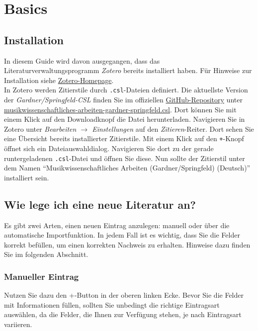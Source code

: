 \section{Basics}\label{guide}
\subsection{Installation}
In diesem Guide wird davon ausgegangen, dass das Literaturverwaltungsprogramm \textit{Zotero} bereits installiert haben. F\"ur Hinweise zur Installation siehe \href{https://www.zotero.org/support/installation}{Zotero-Homepage}.\\
In Zotero werden Zitierstile durch \verb|.csl|-Dateien definiert.
Die aktuellste Version der \textit{Gardner/Springfeld-CSL} finden Sie im offiziellen \href{https://github.com/digimuwi/MWA_csl}{GitHub-Re\-po\-si\-to\-ry}
unter
\href{https://github.com/digimuwi/MWA_csl/blob/main/musikwissenschaftliches-arbeiten-gardner-springfeld.csl}{musik\-wissen\-schaft\-liches-ar\-bei\-ten-gard\-ner-spring\-feld.csl}.
Dort k\"onnen Sie mit einem Klick auf den Downloadknopf die Datei herunterladen.
Navigieren Sie in Zotero unter \textit{Bearbeiten $\rightarrow$ Einstellungen} auf den \textit{Zitieren}-Reiter.
Dort sehen Sie eine \"Ubersicht bereits installierter Zitierstile. Mit einem Klick auf den \verb|+|-Knopf \"offnet sich ein Dateiauswahldialog.
Navigieren Sie dort zu der gerade runtergeladenen \verb|.csl|-Datei und \"offnen Sie diese.
Nun sollte der Zitierstil unter dem Namen "`Musikwissenschaftliches Arbeiten (Gardner/Springfeld) (Deutsch)"' installiert sein.
\newpage

\subsection{Wie lege ich eine neue Literatur an?}
Es gibt zwei Arten, einen neuen Eintrag anzulegen: manuell oder über die 
automatische Importfunktion. In jedem Fall ist es wichtig, dass Sie die Felder korrekt bef\"ullen, um einen korrekten Nachweis zu erhalten. Hinweise dazu finden Sie im folgenden Abschnitt.

\subsubsection*{Manueller Eintrag}
Nutzen Sie dazu den +-Button in der oberen linken Ecke. Bevor Sie die 
Felder mit Informationen füllen, sollten Sie unbedingt die richtige 
Eintragsart auswählen, da die Felder, die Ihnen zur Verfügung stehen, 
je nach Eintragsart variieren.

